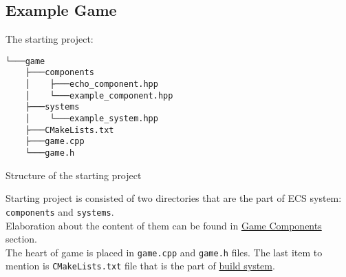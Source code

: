 \newpage
\subsection{Example Game}
The starting project:
\begin{verbatim}
└───game
    ├───components
    │    ├───echo_component.hpp
    │    └───example_component.hpp
    ├───systems
    │    └───example_system.hpp
    ├───CMakeLists.txt
    ├───game.cpp
    └───game.h
\end{verbatim}
\begin{table}[h]
\caption{Structure of the starting project}
\end{table}
Starting project is consisted of two directories that are the part of ECS system: \texttt{components} and \texttt{systems}.\\Elaboration about the content of them can be found in \hyperref[sec:game_components]{Game Components} section.\\ The heart of game is placed in \texttt{game.cpp} and \texttt{game.h} files. The last item to mention is \texttt{CMakeLists.txt} file that is the part of \hyperref[sec:build]{build system}.

